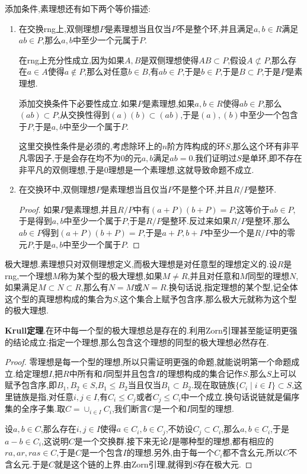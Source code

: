 添加条件,素理想还有如下两个等价描述:
\begin{enumerate}
	\item 在交换rng上,双侧理想$P$是素理想当且仅当$P$不是整个环,并且满足$a,b\in R$满足$ab\in P$,那么$a,b$中至少一个元属于$P$.
	
	在rng上充分性成立,因为如果$A,B$是双侧理想使得$AB\subset P$,假设$A\not\subset P$,那么存在$a\in A$使得$a\not\in P$,那么对任意$b\in B$,有$ab\in P$,于是$b\in P$,于是$B\subset P$,于是$P$是素理想.
	
	添加交换条件下必要性成立.如果$P$是素理想,如果$a,b\in R$使得$ab\in P$,那么$(ab)\subset P$,从交换性得到$(a)(b)\subset (ab)$,于是$(a),(b)$中至少一个包含于$P$,于是$a,b$中至少一个属于$P$.
	
	这里交换性条件是必须的,考虑除环上的$n$阶方阵构成的环$S$,那么这个环有非平凡零因子,于是会存在均不为0的元$a,b$满足$ab=0$.我们证明过$S$是单环,即不存在非平凡的双侧理想,于是0理想是一个素理想,这就导致命题不成立.
	\item 在交换环中,双侧理想$P$是素理想当且仅当$P$不是整个环,并且$R/P$是整环.
	\begin{proof}
		
		如果$P$是素理想,并且$R/P$中有$(a+P)(b+P)=P$,这等价于$ab\in P$,于是得到$a,b$中至少一个属于$P$,于是$R/P$是整环.反过来如果$R/P$是整环,那么$ab\in P$得到$(a+P)(b+P)=P$,于是$a+P,b+P$中至少一个是$R/P$中的零元$P$,于是$a,b$中至少一个属于$P$.
	\end{proof}
\end{enumerate}

极大理想.素理想只对双侧理想定义,而极大理想是对任意型的理想定义的.设$R$是rng,一个理想$M$称为某个型的极大理想,如果$M\not=R$,并且对任意和$M$同型的理想$N$,如果满足$M\subset N\subset R$,那么有$N=M$或$N=R$.换句话说,指定理想的某个型,记全体这个型的真理想构成的集合为$S$,这个集合上赋予包含序,那么极大元就称为这个型的极大理想.

\textbf{Krull定理}.在环中每一个型的极大理想总是存在的.利用Zorn引理甚至能证明更强的结论成立:指定一个理想,那么包含这个理想的同型的极大理想必然存在.
\begin{proof}
	
	零理想是每一个型的理想,所以只需证明更强的命题,就能说明第一个命题成立.给定理想$I$,把$R$中所有和$I$同型并且包含$I$的理想构成的集合记作$S$.那么$S$上可以赋予包含序,即$B_1,B_2\in S$,$B_1\le B_2$当且仅当$B_1\subset B_2$.现在取链族$\{C_i\mid i\in I\}\subset S$,这里链族是指,对任意$i,j\in I $,有$C_i\le C_j$或者$C_j\le C_i$中一个成立.换句话说链就是偏序集的全序子集.取$C=\cup_{i\in I}C_i$,我们断言$C$是一个和$I$同型的理想.
	
	设$a,b\in C$,那么存在$i,j\in I$使得$a\in C_i,b\in C_j$,不妨设$C_j\subset C_i$,那么$a,b\in C_i$,于是$a-b\in C_i$,这说明$C$是一个交换群.接下来无论$I$是哪种型的理想,都有相应的$ra,ar,ras\in C$,于是$C$是一个包含$I$的理想.另外,由于每一个$C_i$都不含幺元,所以$C$不含幺元.于是$C$就是这个链的上界.由Zorn引理,就得到$S$存在极大元.
	
\end{proof}

